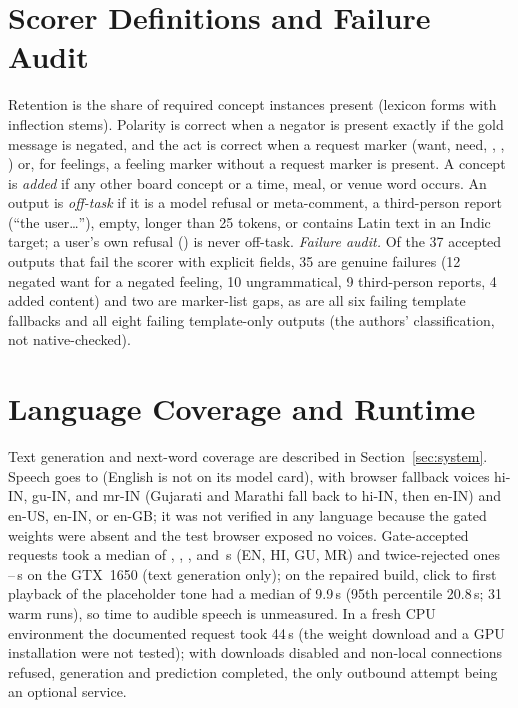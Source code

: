 \section{Scorer Definitions and Failure Audit}
\label{app:scorer}
Retention is the share of required concept instances present (lexicon forms with inflection stems). Polarity is correct when a negator is present exactly if the gold message is negated, and the act is correct when a request marker (want, need, , , ) or, for feelings, a feeling marker without a request marker is present. A concept is \emph{added} if any other board concept or a time, meal, or venue word occurs.
An output is \emph{off-task} if it is a model refusal or meta-comment, a third-person report (``the user\ldots''), empty, longer than 25 tokens, or contains Latin text in an Indic target; a user's own refusal () is never off-task.
\emph{Failure audit.} Of the 37 accepted outputs that fail the scorer with explicit fields, 35 are genuine failures (12 negated want for a negated feeling, 10 ungrammatical, 9 third-person reports, 4 added content) and two are marker-list gaps, as are all six failing template fallbacks and all eight failing template-only outputs (the authors' classification, not native-checked).



\section{Language Coverage and Runtime}
\label{app:coverage}
Text generation and next-word coverage are described in Section~\ref{sec:system}. Speech goes to \indicf{} (English is not on its model card), with browser fallback voices hi-IN, gu-IN, and mr-IN (Gujarati and Marathi fall back to hi-IN, then en-IN) and en-US, en-IN, or en-GB; it was not verified in any language because the gated weights were absent and the test browser exposed no voices.
Gate-accepted requests took a median of \LatMedAccEN{}, \LatMedAccHI{}, \LatMedAccGU{}, and \LatMedAccMR{}\,s (EN, HI, GU, MR) and twice-rejected ones \LatFbMin{}--\LatFbMax{}\,s on the GTX~1650 (text generation only); on the repaired build, click to first playback of the placeholder tone had a median of 9.9\,s (95th percentile 20.8\,s; 31 warm runs), so time to audible speech is unmeasured.
In a fresh CPU environment the documented request took 44\,s (the weight download and a GPU installation were not tested); with downloads disabled and non-local connections refused, generation and prediction completed, the only outbound attempt being an optional service.

